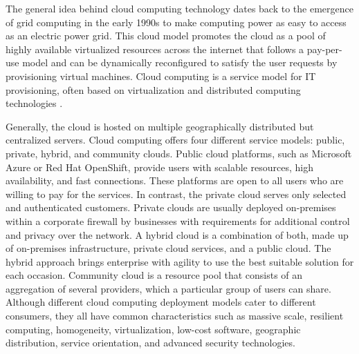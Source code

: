 The general idea behind cloud computing technology dates back to the emergence of grid computing in the early 1990s to make computing power as easy to access as an electric power grid. This cloud model promotes the cloud as a pool of highly available virtualized resources across the internet that follows a pay-per-use model and can be dynamically reconfigured to satisfy the user requests by provisioning virtual machines. Cloud computing is a service model for IT provisioning, often based on virtualization and distributed computing technologies \cite{Lombardi2011}. \cite{Xing2012}

Generally, the cloud is hosted on multiple geographically distributed but centralized servers. Cloud computing offers four different service models: public, private, hybrid, and community clouds. Public cloud platforms, such as Microsoft Azure or Red Hat OpenShift, provide users with scalable resources, high availability, and fast connections. These platforms are open to all users who are willing to pay for the services. In contrast, the private cloud serves only selected and authenticated customers. Private clouds are usually deployed on-premises within a corporate firewall by businesses with requirements for additional control and privacy over the network. A hybrid cloud is a combination of both, made up of on-premises infrastructure, private cloud services, and a public cloud. The hybrid approach brings enterprise with agility to use the best suitable solution for each occasion\cite{NetApp}. Community cloud is a resource pool that consists of an aggregation of several providers, which a particular group of users can share. Although different cloud computing deployment models cater to different consumers, they all have common characteristics such as massive scale, resilient computing, homogeneity, virtualization, low-cost software, geographic distribution, service orientation, and advanced security technologies. \cite{MicrosoftAzure}\cite{Taleb2017}\cite{Xing2012}









